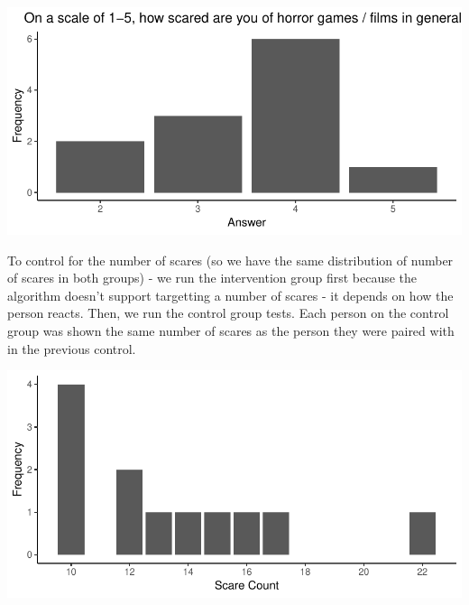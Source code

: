 \documentclass[12pt,a4paper]{article}\usepackage[]{graphicx}\usepackage[]{color}
\makeatletter
\def\maxwidth{ %
  \ifdim\Gin@nat@width>\linewidth
    \linewidth
  \else
    \Gin@nat@width
  \fi
}
\newenvironment{knitrout}{}{} %
\makeatother
\begin{document}
\begin{knitrout}
\color{fgcolor}

{\centering \includegraphics[width=\maxwidth]{figure/unnamed-chunk-2-1} 

}



\end{knitrout}

To control for the number of scares (so we have the same distribution of number of scares in both groups) - we run the intervention group first because the algorithm doesn't support targetting a number of scares - it depends on how the person reacts.
Then, we run the control group tests. Each person on the control group was shown the same number of scares as the person they were paired with in the previous control.

\begin{knitrout}
\color{fgcolor}

{\centering \includegraphics[width=\maxwidth]{figure/unnamed-chunk-3-1} 

}



\end{knitrout}
\end{document}
